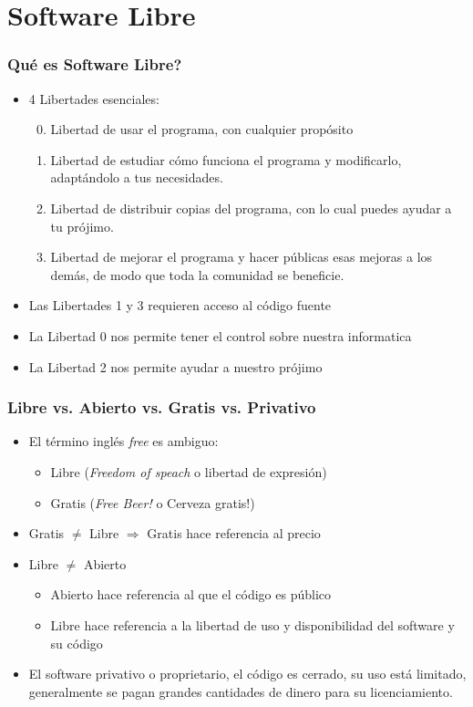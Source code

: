 \section{Software Libre}
\begin{frame}
  \frametitle{Qué es Software Libre?}
  \begin{itemize}
    \item 4 Libertades esenciales:
    \begin{enumerate}
      \setcounter{enumi}{-1}
      \item Libertad de \alert{usar} el programa, con cualquier propósito
      \item Libertad de \alert{estudiar} cómo funciona el programa y \alert{modificarlo}, adaptándolo a tus necesidades.
      \item Libertad de \alert{distribuir copias} del programa, con lo cual puedes ayudar a tu prójimo.
      \item Libertad de \alert{mejorar} el programa y \alert{hacer públicas} esas mejoras a los demás, de modo que toda la comunidad se beneficie. 
    \end{enumerate}
    \item Las \alert{Libertades 1} y \alert{3} requieren acceso al código fuente
    \item La \alert{Libertad 0} nos permite tener el control sobre nuestra informatica
    \item La \alert{Libertad 2} nos permite ayudar a nuestro prójimo
  \end{itemize}
\end{frame}
\begin{frame}
  \frametitle{Libre vs. Abierto vs. Gratis vs. Privativo}
  \begin{itemize}
    \item El término inglés \alert{\emph{free}} es ambiguo:
    \begin{itemize}
      \item Libre (\emph{Freedom of speach} o libertad de expresión)
      \item Gratis (\emph{Free Beer!} o Cerveza gratis!)
    \end{itemize}
    \item Gratis \alert{$\ne$} Libre $\Rightarrow$ \alert{Gratis} hace referencia al precio
    \item Libre \alert{$\ne$} Abierto
    \begin{itemize}
      \item \alert{Abierto} hace referencia al que el código es público
      \item \alert{Libre} hace referencia a la libertad de uso y disponibilidad del software y su código
    \end{itemize}
    \item El \alert{software privativo} o \alert{proprietario}, el código es cerrado, su uso está limitado, generalmente se pagan grandes cantidades de dinero para su licenciamiento.
  \end{itemize}
\end{frame}
